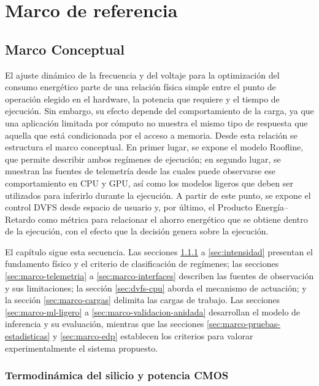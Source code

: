 \chapter{Marco de referencia}

\section{Marco Conceptual}
\label{sec:marco-conceptual}

El ajuste dinámico de la frecuencia y del voltaje para la optimización del consumo energético parte de una relación física simple entre el punto de operación elegido en el hardware, la potencia que requiere y el tiempo de ejecución. Sin embargo, su efecto depende del comportamiento de la carga, ya que una aplicación limitada por cómputo no muestra el mismo tipo de respuesta que aquella que está condicionada por el acceso a memoria. Desde esta relación se estructura el marco conceptual. En primer lugar, se expone el modelo Roofline, que permite describir ambos regímenes de ejecución; en segundo lugar, se muestran las fuentes de telemetría desde las cuales puede observarse ese comportamiento en CPU y GPU, así como los modelos ligeros que deben ser utilizados para inferirlo durante la ejecución. A partir de este punto, se expone el control DVFS desde espacio de usuario y, por último, el Producto Energía--Retardo como métrica para relacionar el ahorro energético que se obtiene dentro de la ejecución, con el efecto que la decisión genera sobre la ejecución.

El capítulo sigue esta secuencia. Las secciones \ref{sec:marco-cmos} a
\ref{sec:intensidad} presentan el fundamento físico y el criterio de
clasificación de regímenes; las secciones \ref{sec:marco-telemetria} a
\ref{sec:marco-interfaces} describen las fuentes de observación y sus
limitaciones; la sección \ref{sec:dvfs-cpu} aborda el mecanismo de actuación;
y la sección \ref{sec:marco-cargas} delimita las cargas de trabajo. Las
secciones \ref{sec:marco-ml-ligero} a
\ref{sec:marco-validacion-anidada} desarrollan el modelo de inferencia y su
evaluación, mientras que las secciones
\ref{sec:marco-pruebas-estadisticas} y \ref{sec:marco-edp} establecen los
criterios para valorar experimentalmente el sistema propuesto.

\subsection{Termodinámica del silicio y potencia CMOS}
\label{sec:marco-cmos}

